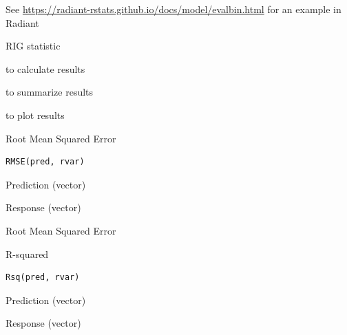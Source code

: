 \documentclass[a4paper]{book}
\begin{document}
%
\begin{Details}
See \url{https://radiant-rstats.github.io/docs/model/evalbin.html} for an example in Radiant
\end{Details}
%
\begin{Value}
RIG statistic
\end{Value}
%
\begin{SeeAlso}
 to calculate results

 to summarize results

 to plot results
\end{SeeAlso}
%
\begin{Examples}
\end{Examples}
%
\begin{Description}
Root Mean Squared Error
\end{Description}
%
\begin{Usage}
\begin{verbatim}
RMSE(pred, rvar)
\end{verbatim}
\end{Usage}
%
\begin{Arguments}
\begin{ldescription}
\item[\code{pred}] Prediction (vector)

\item[\code{rvar}] Response (vector)
\end{ldescription}
\end{Arguments}
%
\begin{Value}
Root Mean Squared Error
\end{Value}
%
\begin{Description}
R-squared
\end{Description}
%
\begin{Usage}
\begin{verbatim}
Rsq(pred, rvar)
\end{verbatim}
\end{Usage}
%
\begin{Arguments}
\begin{ldescription}
\item[\code{pred}] Prediction (vector)

\item[\code{rvar}] Response (vector)
\end{ldescription}
\end{Arguments}
\end{document}
